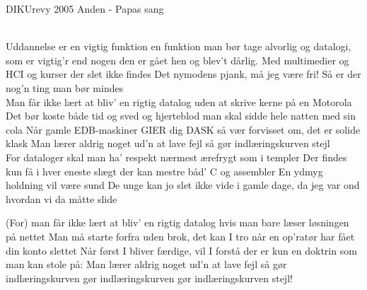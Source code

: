 {DIKUrevy 2005}
{Anden - Papas sang}
{
\\
Uddannelse er en vigtig funktion
en funktion man bør tage alvorlig
og datalogi, som er vigtig'r end nogen
den er gået hen og blev't dårlig.
Med multimedier og HCI
og kurser der slet ikke findes
Det nymodens pjank, må jeg være fri!
Så er der nog'n ting man bør mindes 
\\

Man får ikke lært at bliv' en rigtig datalog
uden at skrive kerne på en Motorola
Det bør koste både tid og sved og hjerteblod
man skal sidde hele natten med sin cola
Når gamle EDB-maskiner GIER dig DASK
så vær forvisset om, det er solide klask
Man lærer aldrig noget ud'n at lave fejl
så gør indlæringskurven stejl
\\

For dataloger skal man ha' respekt
nærmest ærefrygt som i templer
Der findes kun få i hver eneste slægt
der kan mestre båd' C og assembler
En ydmyg holdning vil være sund
De unge kan jo slet ikke vide
i gamle dage, da jeg var ond
hvordan vi da måtte slide


(For) man får ikke lært at bliv' en rigtig datalog
hvis man bare læser løsningen på nettet
Man må starte forfra uden brok, det kan I tro
når en op'ratør har fået din konto slettet
Når først I bliver færdige, vil I forstå
der er kun en doktrin som man kan stole på:
Man lærer aldrig noget ud'n at lave fejl
så gør indlæringskurven
gør indlæringskurven
gør indlæringskurven stejl!
}